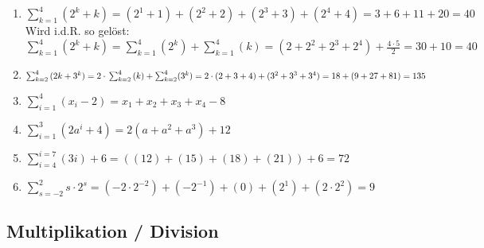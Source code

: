 {{


}{%

\begin{enumerate}[label=\alph*)]
 \item $\sum_{k=1}^{4}{(2^k+k)} = (2^1+1) + (2^2+2) + (2^3+3) +
   (2^4+4) = 3 + 6 + 11 + 20 = 40$\\
   Wird i.d.R. so gelöst:\\
   $\sum_{k=1}^{4}{(2^k+k)} =
   \sum_{k=1}^{4}{(2^k)}+\sum_{k=1}^{4}{(k)} = (2+2^2+2^3+2^4) +
   \frac{4\cdot{}5}{2} = 30+10 = 40$

 \item $\sum_{k=2}^{4}{(2k+3^k)} = 2\cdot{}\sum_{k=2}^4{}(k) +
   \sum_{k=2}^4(3^k) = \\
   2\cdot{}(2+3+4) + (3^2+3^3+3^4) = 18 + (9+27+81) = 135$

 \item $\sum_{i=1}^{4}{(x_i-2)} = x_1+x_2+x_3+x_4 -8$
 \item $\sum_{i=1}^{3}{(2a^i+4)}  = 2(a + a^2 + a^3) + 12$
 \item $\sum_{i=4}^{i=7}(3i) + 6 = ((12) + (15) + (18) +(21) )+6=72$

 \item $\sum_{s=-2}^{2}s\cdot{}2^s = (-2\cdot{}2^{-2}) + (-2^{-1}) + (0) + (2^1) + (2\cdot{}2^2)=9$

\end{enumerate}
}%





\subsection{Multiplikation / Division}

}

